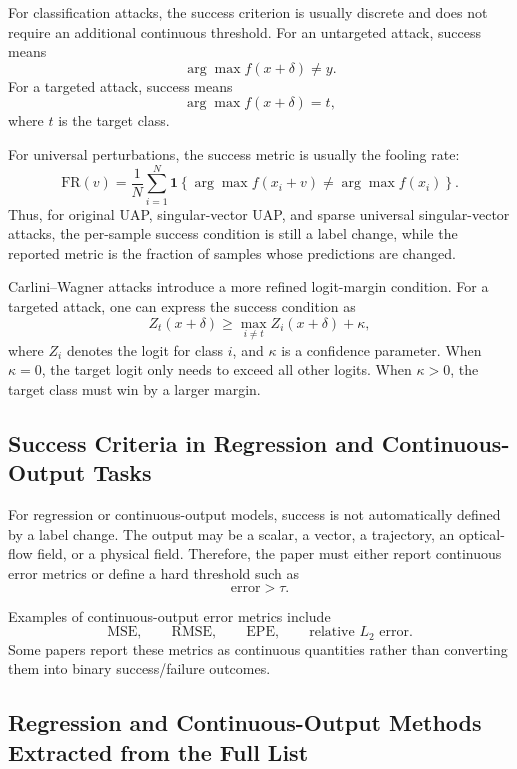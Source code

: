 \documentclass{article}
\begin{document}
For classification attacks, the success criterion is usually discrete and does not require an additional continuous threshold. For an untargeted attack, success means
\[
    \arg\max f(x+\delta)\neq y.
\]
For a targeted attack, success means
\[
    \arg\max f(x+\delta)=t,
\]
where \(t\) is the target class.

For universal perturbations, the success metric is usually the fooling rate:
\[
    \mathrm{FR}(v)
    =
    \frac{1}{N}
    \sum_{i=1}^{N}
    \mathbf{1}
    \left\{
        \arg\max f(x_i+v)
        \neq
        \arg\max f(x_i)
    \right\}.
\]
Thus, for original UAP, singular-vector UAP, and sparse universal singular-vector attacks, the per-sample success condition is still a label change, while the reported metric is the fraction of samples whose predictions are changed.

Carlini--Wagner attacks introduce a more refined logit-margin condition. For a targeted attack, one can express the success condition as
\[
    Z_t(x+\delta)
    \geq
    \max_{i\neq t} Z_i(x+\delta)+\kappa,
\]
where \(Z_i\) denotes the logit for class \(i\), and \(\kappa\) is a confidence parameter. When \(\kappa=0\), the target logit only needs to exceed all other logits. When \(\kappa>0\), the target class must win by a larger margin.

\subsection{Success Criteria in Regression and Continuous-Output Tasks}

For regression or continuous-output models, success is not automatically defined by a label change. The output may be a scalar, a vector, a trajectory, an optical-flow field, or a physical field. Therefore, the paper must either report continuous error metrics or define a hard threshold such as
\[
    \mathrm{error}>\tau.
\]

Examples of continuous-output error metrics include
\[
    \mathrm{MSE},
    \qquad
    \mathrm{RMSE},
    \qquad
    \mathrm{EPE},
    \qquad
    \text{relative }L_2\text{ error}.
\]
Some papers report these metrics as continuous quantities rather than converting them into binary success/failure outcomes.

\subsection{Regression and Continuous-Output Methods Extracted from the Full List}
\end{document}
